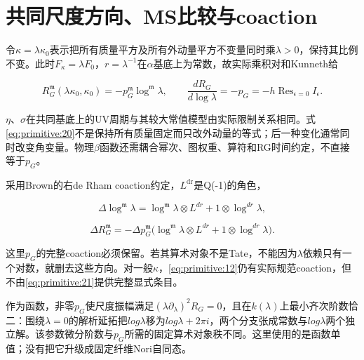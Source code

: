 \documentclass[11pt,a4paper,oneside]{ctexrep}
\theoremstyle{cnplain}
\theoremstyle{definition}
\theoremstyle{remark}
\begin{document}
\section{共同尺度方向、MS比较与coaction}\label{sec:primitive:8}

令\(\kappa =\lambda \kappa _0\)表示把所有质量平方及所有外动量平方不变量同时乘\(\lambda >0\)，保持其比例不变。此时\(F_\kappa =\lambda F_0\)，\(r=\lambda ^{-1}\)在\(\alpha \)基底上为常数，故实际乘积对和Kunneth给

\begin{equation}
R_G^{\mathfrak m}(\lambda\kappa_0,\kappa_0)
                       =-p_G^{\mathfrak m}\log^{\mathfrak m}\lambda,
 \qquad \frac{dR_G}{d\log\lambda}=-p_G
                         =-h\operatorname{Res}_{\epsilon=0}I_\epsilon.      \label{eq:primitive:20}
\end{equation}

\(\eta \)、\(\sigma \)在共同基底上的UV周期与其较大常值模型由实际限制关系相同。式\eqref{eq:primitive:20}不是保持所有质量固定而只改外动量的等式；后一种变化通常同时改变角变量。物理\(\beta \)函数还需耦合幂次、图权重、算符和RG时间约定，不直接等于\(p_G\)。

采用Brown\cite{brownperiods}的右de Rham coaction约定，\(L^{\mathrm{dr}}\)是Q(-1)的角色，

\begin{equation}
\Delta\log^{\mathfrak m}\lambda
   =\log^{\mathfrak m}\lambda\otimes L^{dr}
                         +1\otimes\log^{dr}\lambda,
\end{equation}

\begin{equation}
\Delta R_G^{\mathfrak m}
  =-\Delta p_G^{\mathfrak m}
       \big(\log^{\mathfrak m}\lambda\otimes L^{dr}
                              +1\otimes\log^{dr}\lambda\big).              \label{eq:primitive:21}
\end{equation}

这里\(p_G\)的完整coaction必须保留。若其算术对象不是Tate，不能因为\(\lambda \)依赖只有一个对数，就删去这些方向。对一般\(\kappa \)，\eqref{eq:primitive:12}仍有实际规范coaction，但不由\eqref{eq:primitive:21}提供完整显式条目。

作为函数，非零\(p_G\)使尺度振幅满足\((\lambda\partial_\lambda)^2R_G=0\)，且在\(k(\lambda )\)上最小齐次阶数恰二：围绕\(\lambda =0\)的解析延拓把\(log \lambda \)移为\(log \lambda +2\pi i\)，两个分支张成常数与\(log \lambda \)两个独立解。该参数微分阶数与\(p_G\)所需的固定算术对象秩不同。这里使用的是函数单值；没有把它升级成固定纤维Nori自同态。
\end{document}
